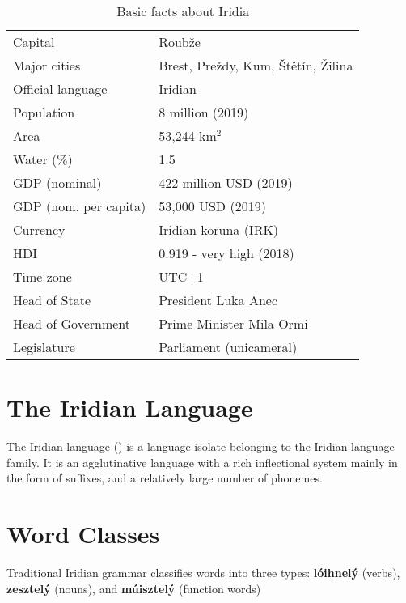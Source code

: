 \begin{table}
\centering \begin{tabular}{ll} \hline
Capital & Roubže \\
Major cities & Brest, Preždy, Kum, Štětín, Žilina \\
Official language & Iridian \\
Population & 8 million (2019) \\
Area & 53,244 km$^2$ \\
Water (\%) & 1.5 \\
GDP (nominal) & 422 million USD (2019) \\
GDP (nom. per capita) & 53,000 USD (2019) \\
Currency & Iridian koruna (IRK) \\
HDI & 0.919 - very high (2018) \\
Time zone & UTC+1 \\
Head of State & President Luka Anec \\
Head of Government & Prime Minister Mila Ormi \\
Legislature & Parliament (unicameral)\\
\hline
\end{tabular}
\caption{Basic facts about Iridia}
\label{tab:fact-sheet}
\end{table}


\section{The Iridian Language}

The Iridian language () is a language isolate belonging to the Iridian language family. It is an agglutinative language with a rich inflectional system mainly in the form of suffixes, and a relatively large number of phonemes.


\section{Word Classes}\label{sec:wordclasses}
Traditional Iridian grammar classifies words into three types: \textbf{lóihnelý} (verbs), \textbf{zesztelý} (nouns), and \textbf{múisztelý} (function words)
